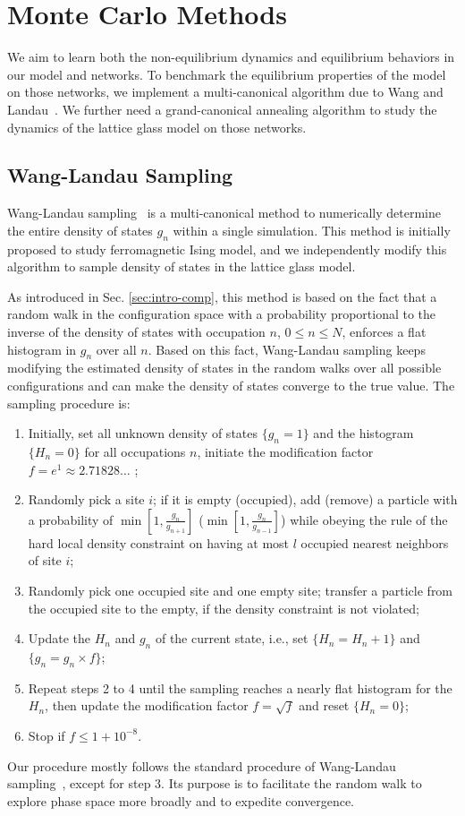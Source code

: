 \section{Monte Carlo Methods}
\label{sec:jam_methods} 

We aim to learn both the non-equilibrium dynamics and equilibrium behaviors in our model and networks. To benchmark the equilibrium properties of the model on those networks, we implement a multi-canonical algorithm due to Wang and Landau~\cite{Wang2001, wang01a}. We further need a grand-canonical annealing algorithm to study the dynamics of the
lattice glass model on those networks.

\subsection{Wang-Landau Sampling}
\label{sub:WLsampling}Wang-Landau sampling~\cite{Wang2001} is a
multi-canonical method to numerically determine the entire density
of states $g_{n}$ within a single simulation. This method is initially proposed to study 
ferromagnetic Ising model, and we independently modify this algorithm to sample  
density of states in the lattice glass model.
 
As introduced in Sec. \ref{sec:intro-comp}, this method is based on 
the fact that a random walk in the configuration space with a probability
proportional to the inverse of the density of states with occupation
$n$, $0\leq n\leq N$, enforces a flat histogram in $g_{n}$ over
all $n$. Based on this fact, Wang-Landau sampling keeps modifying
the estimated density of states in the random walks over all possible
configurations and can make the density of states converge to the
true value. The sampling procedure is: 
\begin{enumerate}
\item Initially, set all unknown density of states $\{g_{n}=1\}$ and the
histogram $\{H_{n}=0\}$ for all occupations $n$, initiate the modification
factor $f=e^1\approx2.71828\dots$ ; 
\item Randomly pick a site $i$; if it is empty (occupied), add (remove)
a particle with a probability of $\min\left[1,\frac{g_{n}}{g_{n+1}}\right]$
($\min\left[1,\frac{g_{n}}{g_{n-1}}\right]$) while obeying the rule
of the hard local density constraint on having at most $l$ occupied
nearest neighbors of site $i$; 
\item Randomly pick one occupied site and one empty site; transfer
a particle from the occupied site to the empty, if the density constraint is not violated; 
\item Update the $H_{n}$ and $g_{n}$ of the current state, i.e., set $\{H_{n}=H_{n}+1\}$
and $\{g_{n}=g_{n}\times f\}$; 
\item Repeat steps 2 to 4 until the sampling reaches a nearly flat histogram
for the $H_{n}$, then update the modification factor $f=\sqrt{f}$
and reset $\{H_{n}=0\}$; 
\item Stop if $f\le1+10^{-8}$. 
\end{enumerate}
Our procedure mostly follows the standard procedure of Wang-Landau
sampling~\cite{Wang2001}, except for step 3. Its purpose is to facilitate
the random walk to explore phase space more broadly and to expedite
convergence.


